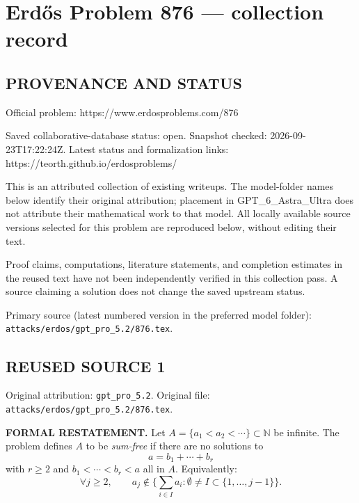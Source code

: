 \section*{Erd\H{o}s Problem 876 --- collection record}

\subsection*{PROVENANCE AND STATUS}
Official problem: https://www.erdosproblems.com/876

Saved collaborative-database status: open.
Snapshot checked: 2026-09-23T17:22:24Z.
Latest status and formalization links: https://teorth.github.io/erdosproblems/

This is an attributed collection of existing writeups. The model-folder names below identify their original attribution; placement in GPT\_6\_Astra\_Ultra does not attribute their mathematical work to that model. All locally available source versions selected for this problem are reproduced below, without editing their text.

Proof claims, computations, literature statements, and completion estimates in the reused text have not been independently verified in this collection pass. A source claiming a solution does not change the saved upstream status.

Primary source (latest numbered version in the preferred model folder): \texttt{attacks/erdos/gpt\_pro\_5.2/876.tex}.

\subsection*{REUSED SOURCE 1}
Original attribution: \texttt{gpt\_pro\_5.2}.
Original file: \texttt{attacks/erdos/gpt\_pro\_5.2/876.tex}.


\noindent\textbf{FORMAL RESTATEMENT.}
Let $A=\{a_1<a_2<\cdots\}\subset\mathbb N$ be infinite.
The problem defines $A$ to be \emph{sum-free} if there are no solutions to
\[
 a=b_1+\cdots+b_r
\]
with $r\ge 2$ and $b_1<\cdots<b_r<a$ all in $A$.
Equivalently:
\[
\forall j\ge 2,\qquad a_j\notin \Big\{\sum_{i\in I} a_i: \emptyset\neq I\subset\{1,\dots,j-1\}\Big\}.
\]

